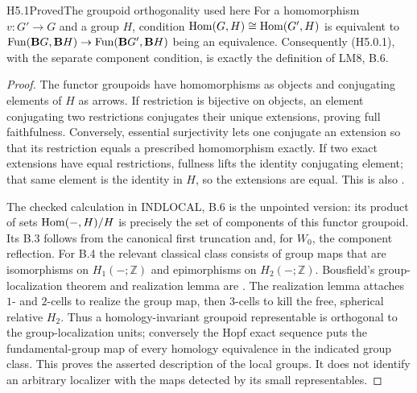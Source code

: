 \begin{claim}{H5.1}{Proved}{The groupoid orthogonality used here}
For a homomorphism $v:G'\to G$ and a group $H$, condition
$\operatorname{Hom}(G,H)\cong\operatorname{Hom}(G',H)$ is equivalent to
$\operatorname{Fun}(\mathbf BG,\mathbf BH)\to\operatorname{Fun}(\mathbf BG',\mathbf BH)$
being an equivalence. Consequently (H5.0.1), with the separate
component condition, is exactly the definition of LM8, B.6.
\end{claim}
\begin{proof}
The functor groupoids have homomorphisms as objects and conjugating
elements of $H$ as arrows. If restriction is bijective on objects,
an element conjugating two restrictions conjugates their unique
extensions, proving full faithfulness. Conversely, essential
surjectivity lets one conjugate an extension so that its restriction
equals a prescribed homomorphism exactly. If two exact extensions
have equal restrictions, fullness lifts the identity conjugating
element; that same element is the identity in $H$, so the extensions
are equal. This is also \citet[Theorem 1.3]{EH5CGT2006}.

The checked calculation in INDLOCAL, B.6 is the unpointed version:
its product of sets $\operatorname{Hom}(-,H)/H$ is precisely the set of
components of this functor groupoid. Its B.3 follows from the
canonical first truncation and, for $W_0$, the component reflection.
For B.4 the relevant classical class consists of group maps that
are isomorphisms on $H_1(-;\mathbb Z)$ and epimorphisms on
$H_2(-;\mathbb Z)$. Bousfield's group-localization theorem and
realization lemma are \citet[Theorems 5.2, 5.5 and Lemma 6.1]{EH5Bousfield1975}.
The realization lemma attaches $1$- and $2$-cells to realize the
group map, then $3$-cells to kill the free, spherical relative
$H_2$. Thus a homology-invariant groupoid representable is
orthogonal to the group-localization units; conversely the Hopf
exact sequence puts the fundamental-group map of every homology
equivalence in the indicated group class. This proves the asserted
description of the local groups. It does not identify an arbitrary
localizer with the maps detected by its small representables.
\end{proof}

